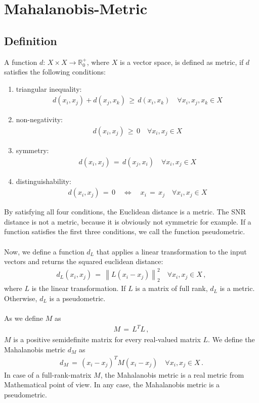 \documentclass[12pt,paper=a4]{scrartcl}
\theoremstyle{break}
\newcommand{\norm}[1]{\left\lVert#1\right\rVert}
\begin{document}
\section{Mahalanobis-Metric}
\subsection{Definition}
A function $d:\, X\times X\rightarrow \mathbb{R}_0^+$, where $X$ is a vector space, is defined as metric, if $d$ satisfies the following conditions:
\begin{enumerate}
\item triangular inequality:
\begin{align}
d(x_i,x_j)+d(x_j,x_k)\, \geq\, d(x_i,x_k)\quad \forall x_i, x_j, x_k \in X
\end{align}
\item non-negativity:
\begin{align}
d(x_i,x_j)\,\geq\, 0\quad \forall x_i,x_j\in X
\end{align}
\item symmetry:
\begin{align}
d(x_i,x_j)\, =\, d(x_j,x_i)\quad \forall x_i, x_j\in X
\end{align}
\item distinguishability:
\begin{align}
d(x_i,x_j)\, = \, 0\quad \Leftrightarrow\quad x_i\, = \, x_j \quad\forall x_i,x_j\in X
\end{align}
\end{enumerate}
By satisfying all four conditions, the Euclidean distance is a metric. The SNR distance is not a metric, because it is obviously not symmetric for example. If a function satisfies the first three conditions, we call the function pseudometric. \\ \\
Now, we define a function $d_L$ that applies a linear transformation to the input vectors and returns the squared euclidean distance:
\begin{align}
d_L(x_i, x_j)\,=\,\norm{L(x_i-x_j)}_2^2\quad \forall x_i,x_j\in X\, ,
\end{align}
where $L$ is the linear transformation. If $L$ is a matrix of full rank, $d_L$ is a metric. Otherwise, $d_L$ is a pseudometric. \\ \\
As we define $M$ as
\begin{align}
M \, = \, L^T L\, ,
\end{align}
$M$ is a positive semidefinite matrix for every real-valued matrix $L$. We define the Mahalanobis metric $d_M$ as
\begin{align}
d_M\, =\, (x_i - x_j)^T M (x_i-x_j)\quad \forall x_i,x_j\in X\, .
\end{align}
In case of a full-rank-matrix $M$, the Mahalanobis metric is a real metric from Mathematical point of view. In any case, the Mahalanobis metric is a pseudometric.
\end{document}
